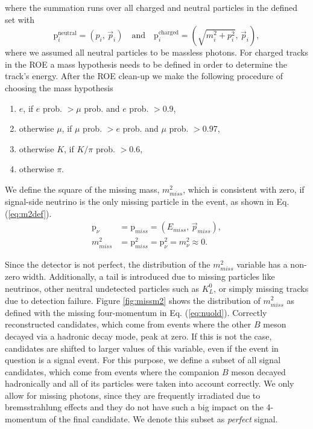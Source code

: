 where the summation runs over all charged and neutral particles in the defined set with
\begin{equation}
\mathrm{p}^{\mathrm{neutral}}_i = \left(p_i,\, \vec{p}_i \right) \quad \mathrm{and} \quad \mathrm{p}^{\mathrm{charged}}_i = \left(\sqrt{m_i^2 + p_i^2},\, \vec{p}_i \right),
\label{eq:pcharged}
\end{equation}
where we assumed all neutral particles to be massless photons. For charged tracks in the ROE a mass hypothesis needs to be defined in order to determine the track's energy. After the ROE clean-up we make the following procedure of choosing the mass hypothesis
\begin{enumerate}
	\item $e$, if $e$ prob. $> \mu$ prob. and $e$ prob. $> 0.9$,
	\item otherwise $\mu$, if $\mu$ prob. $> e$ prob. and $\mu$ prob. $> 0.97$,
	\item otherwise $K$, if $K/\pi$ prob. $> 0.6$,
	\item otherwise $\pi$.
\end{enumerate} 
We define the square of the missing mass, $m_{miss}^2$, which is consistent with zero, if signal-side neutrino is the only missing particle in the event, as shown in Eq. (\ref{eq:m2def}).
\begin{align}
\label{eq:nuold}
\mathrm{p}_\nu &= \mathrm{p}_{miss} = \left(E_{miss},\,\vec{p}_{miss} \right),\\
\label{eq:m2def}
m_{miss}^2 &= \mathrm{p}_{miss}^2 = \mathrm{p}_{\nu}^2 = m_\nu^2 \approx 0.
\end{align}

Since the detector is not perfect, the distribution of the $m_{miss}^2$ variable has a non-zero width. Additionally, a tail is introduced due to missing particles like neutrinos, other neutral undetected particles such as $K_L^0$, or simply missing tracks due to detection failure. Figure \ref{fig:missm2} shows the distribution of $m_{miss}^2$ as defined with the missing four-momentum in Eq. (\ref{eq:nuold}). Correctly reconstructed candidates, which come from events where the other $B$ meson decayed via a hadronic decay mode, peak at zero. If this is not the case, candidates are shifted to larger values of this variable, even if the event in question is a signal event. For this purpose, we define a subset of all signal candidates, which come from events where the companion $B$ meson decayed hadronically and all of its particles were taken into account correctly. We only allow for missing photons, since they are frequently irradiated due to bremsstrahlung effects and they do not have such a big impact on the 4-momentum of the final candidate. We denote this subset as \textit{perfect} signal.

